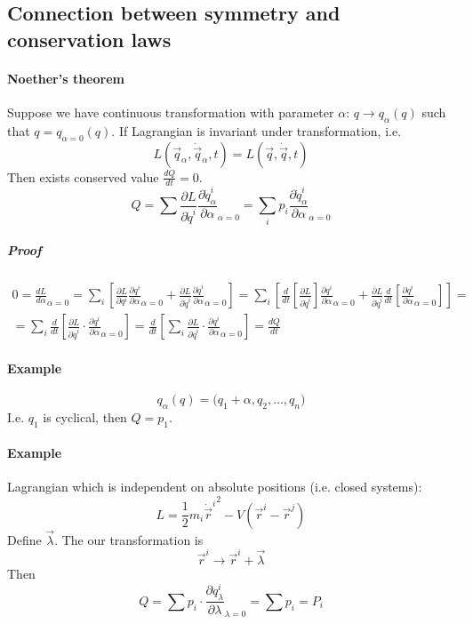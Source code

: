 \subsection{Connection between symmetry and conservation laws}
\paragraph{Noether's theorem}
Suppose we have continuous transformation with parameter $\alpha$: $q \to q_\alpha(q)$ such that $q = q_{\alpha = 0} (q)$. If Lagrangian is invariant under transformation, i.e.
$$L(\vec{q}_\alpha, \dot{\vec{q}}_\alpha,t)=L(\vec{q}, \dot{\vec{q}},t)$$
Then exists conserved value $\frac{dQ}{dt} = 0$.
$$Q = \sum \frac{\partial L}{\partial \dot{q}^i} \frac{\partial \dot{q}^i_\alpha}{\partial \alpha}_{\alpha = 0} = \sum_i p_i \frac{\partial \dot{q}^i_\alpha}{\partial \alpha}_{\alpha = 0}$$
\subparagraph{Proof}
\begin{align*}
0 = \frac{d L}{d \alpha}_{\alpha = 0} = \sum_i \left[ \frac{\partial L}{\partial q^i} \frac{\partial q^i}{\partial \alpha}_{\alpha = 0}+\frac{\partial L}{\partial \dot{q}^i} \frac{\partial \dot{q}^i}{\partial \alpha}_{\alpha = 0}\right] = 
\sum_i \left[ \frac{d}{dt}\left[\frac{\partial L}{\partial \dot{q}^i}\right] \frac{\partial q^i}{\partial \alpha}_{\alpha = 0}+\frac{\partial L}{\partial \dot{q}^i} \frac{d}{dt}\left[\frac{\partial q^i}{\partial \alpha}_{\alpha = 0}\right]\right] =\\= \sum_i \frac{d}{dt} \left[  \frac{\partial L}{\partial \dot{q}^i} \cdot \frac{\partial q^i}{\partial \alpha}_{\alpha = 0}\right] = \frac{d}{dt} \left[ \sum_i   \frac{\partial L}{\partial \dot{q}^i} \cdot \frac{\partial q^i}{\partial \alpha}_{\alpha = 0}\right] = \frac{dQ}{dt}
\end{align*}
\paragraph{Example}
$$q_\alpha(q) = \big( q_1+\alpha, q_2, \dots, q_n \big)$$
I.e. $q_1$ is cyclical, then $Q = p_1$.
\paragraph{Example}
Lagrangian which is independent on absolute positions (i.e. closed systems):
$$L = \frac{1}{2}m_i{\dot{ \vec{r}}^i}^2 - V(\vec{r}^i - \vec{r}^j)$$
Define $\vec{\lambda}$. The our transformation is
$$\vec{r}^i \to \vec{r}^i +\vec{\lambda}$$
Then
$$Q = \sum p_i \cdot \frac{\partial q_\lambda^i}{\partial \lambda}_{\lambda= 0} = \sum p_i = P_i$$
